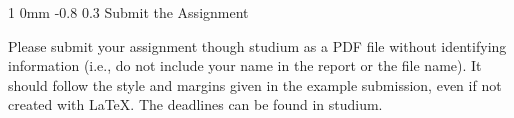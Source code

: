 \documentclass[11pt]{article}
\makeatletter
\renewcommand{\section}{\@startsection
{section}%
{1}%
{0mm}%
{-0.8\baselineskip}%
{0.3\baselineskip}%
{\bfseries\large}}%
\makeatother
\begin{document}
\section{Submit the Assignment}

Please submit your assignment though studium as a PDF file without identifying
information (i.e., do not include your name in the report or the file name). It
should follow the style and margins given in the example submission, even if
not created with LaTeX. The deadlines can be found in studium.




\end{document}
